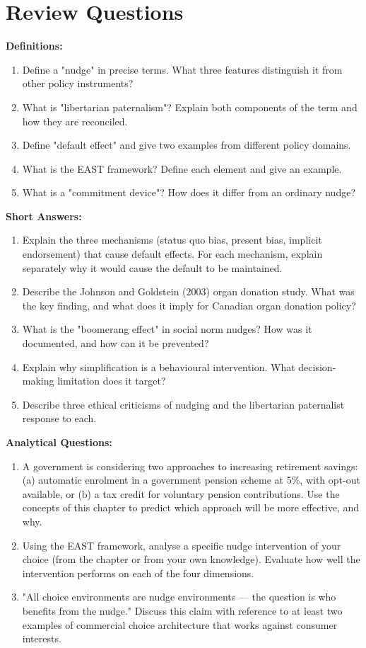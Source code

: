 \documentclass[12pt, letterpaper]{article}
\begin{document}
\medskip


\section*{Review Questions}


\textbf{Definitions:}
\begin{enumerate}
\item Define a "nudge" in precise terms. What three features distinguish it from other policy instruments?
\item What is "libertarian paternalism"? Explain both components of the term and how they are reconciled.
\item Define "default effect" and give two examples from different policy domains.
\item What is the EAST framework? Define each element and give an example.
\item What is a "commitment device"? How does it differ from an ordinary nudge?
\end{enumerate}

\textbf{Short Answers:}
\begin{enumerate}
\item Explain the three mechanisms (status quo bias, present bias, implicit endorsement) that cause default effects. For each mechanism, explain separately why it would cause the default to be maintained.
\item Describe the Johnson and Goldstein (2003) organ donation study. What was the key finding, and what does it imply for Canadian organ donation policy?
\item What is the "boomerang effect" in social norm nudges? How was it documented, and how can it be prevented?
\item Explain why simplification is a behavioural intervention. What decision-making limitation does it target?
\item Describe three ethical criticisms of nudging and the libertarian paternalist response to each.
\end{enumerate}

\textbf{Analytical Questions:}
\begin{enumerate}
\item A government is considering two approaches to increasing retirement savings: (a) automatic enrolment in a government pension scheme at 5\%, with opt-out available, or (b) a tax credit for voluntary pension contributions. Use the concepts of this chapter to predict which approach will be more effective, and why.
\item Using the EAST framework, analyse a specific nudge intervention of your choice (from the chapter or from your own knowledge). Evaluate how well the intervention performs on each of the four dimensions.
\item "All choice environments are nudge environments --- the question is who benefits from the nudge." Discuss this claim with reference to at least two examples of commercial choice architecture that works against consumer interests.
\end{enumerate}
\end{document}
